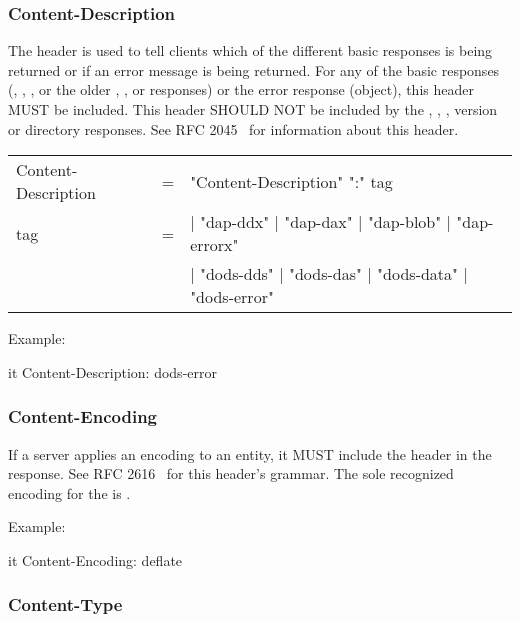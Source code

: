 \documentclass[justify]{dods-paper}
\begin{document}
\subsubsection{Content-Description}

The  header is used to tell clients which of
the different basic responses is being returned or if an error message
is being returned. For any of the basic responses (\DDX, \DAX, \Blob,
or the older \DDS, \DAS, or \DataDDS responses) or the error response
(\ErrorX object), this header MUST be included. This header SHOULD NOT
be included by the \TEXT, \HTML, \INFO, version or directory responses.
See RFC 2045~\cite{rfc2045} for information about this header.

\begin{ttfamily}
\begin{center}
\begin{tabular}{lll}
Content-Description & = & "Content-Description" ":" tag \\
tag & = & | "dap-ddx" | "dap-dax" | "dap-blob" | "dap-errorx" \\
 & & | "dods-dds" | "dods-das" | "dods-data" | "dods-error" \\
\end{tabular}
\end{center}
\end{ttfamily}

Example:

\begin{vcode}{it}
Content-Description: dods-error
\end{vcode}

\subsubsection{Content-Encoding}

If a \DAP server applies an encoding to an entity, it MUST include the
 header in the response. See RFC
2616~\cite{rfc2616} for this header's grammar. The sole recognized
encoding for the \DAP is .

Example:

\begin{vcode}{it}
Content-Encoding: deflate
\end{vcode}

\subsubsection{Content-Type}
\end{document}
